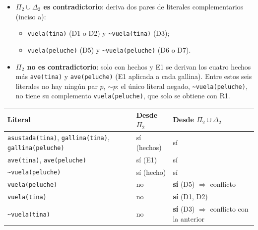 \documentclass[11pt,a4paper]{article}
\newcommand{\nf}{\textasciitilde}                 %
\begin{document}
\begin{itemize}
  \item \textbf{$\Pi_2 \cup \Delta_2$ es contradictorio}: deriva dos pares de literales complementarios (inciso a):
  \begin{itemize}
    \item \texttt{vuela(tina)} (D1 o D2) y \texttt{\nf vuela(tina)} (D3);
    \item \texttt{vuela(peluche)} (D5) y \texttt{\nf vuela(peluche)} (D6 o D7).
  \end{itemize}
  \item \textbf{$\Pi_2$ no es contradictorio}: solo con hechos y E1 se derivan los cuatro hechos más \texttt{ave(tina)} y \texttt{ave(peluche)} (E1 aplicada a cada gallina). Entre estos seis literales no hay ningún par $p$, ${\sim}p$: el único literal negado, \texttt{\nf vuela(peluche)}, no tiene su complemento \texttt{vuela(peluche)}, que solo se obtiene con R1.
\end{itemize}

\begin{center}
\small
\begin{tabular}{@{}l l l@{}}
\toprule
\textbf{Literal} & \textbf{Desde $\Pi_2$} & \textbf{Desde $\Pi_2 \cup \Delta_2$} \\
\midrule
\texttt{asustada(tina)}, \texttt{gallina(tina)}, \texttt{gallina(peluche)} & sí (hechos) & sí \\
\texttt{ave(tina)}, \texttt{ave(peluche)} & sí (E1) & sí \\
\texttt{\nf vuela(peluche)} & sí (hecho) & sí \\
\texttt{vuela(peluche)} & no & \textbf{sí} (D5) \quad $\Rightarrow$ conflicto \\
\texttt{vuela(tina)} & no & \textbf{sí} (D1, D2) \\
\texttt{\nf vuela(tina)} & no & \textbf{sí} (D3) \quad $\Rightarrow$ conflicto con la anterior \\
\bottomrule
\end{tabular}
\end{center}
\end{document}
